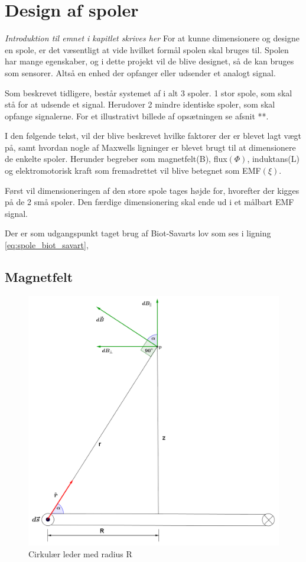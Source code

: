 \section{Design af spoler}\label{sec:sec_spole_design}
\emph{Introduktion til emnet i kapitlet skrives her}
For at kunne dimensionere og designe en spole, er det væsentligt at vide hvilket formål spolen skal bruges til. Spolen har mange egenskaber, og i dette projekt vil de blive designet, så de kan bruges som sensorer. Altså en enhed der opfanger eller udsender et analogt signal. 

Som beskrevet tidligere, består systemet af i alt 3 spoler. 1 stor spole, som skal stå for at udsende et signal. Herudover 2 mindre identiske spoler, som skal opfange signalerne. For et illustrativt billede af opsætningen se afsnit **.

I den følgende tekst, vil der blive beskrevet hvilke faktorer der er blevet lagt vægt på, samt hvordan nogle af Maxwells ligninger er blevet brugt til at dimensionere de enkelte spoler. Herunder begreber som magnetfelt(B), flux$(\Phi)$, induktans(L) og elektromotorisk kraft som fremadrettet vil blive betegnet som EMF$(\xi)$. 

Først vil dimensioneringen af den store spole tages højde for, hvorefter der kigges på de 2 små spoler.
Den færdige dimensionering skal ende ud i et målbart EMF signal.

Der er som udgangspunkt taget brug af Biot-Savarts lov som ses i ligning \ref{eq:spole_biot_savart}, 
\subsection{Magnetfelt}
\begin{figure}[h!]
	\centering
	\includegraphics[width=.6\textwidth]{billeder/B_felt.png}
	\caption{Cirkulær leder med radius R}
	\label{fig:spole_fig1}
\end{figure}

